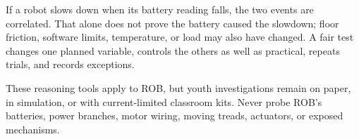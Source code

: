 \begin{advancedbox}[title={CAUSE, CORRELATION, AND A FAIR TEST}]
If a robot slows down when its battery reading falls, the two events are correlated. That alone does not prove the battery caused the slowdown; floor friction, software limits, temperature, or load may also have changed. A fair test changes one planned variable, controls the others as well as practical, repeats trials, and records exceptions.
\end{advancedbox}

\begin{safetybox}
These reasoning tools apply to ROB, but youth investigations remain on paper, in simulation, or with current-limited classroom kits. Never probe ROB's batteries, power branches, motor wiring, moving treads, actuators, or exposed mechanisms.
\end{safetybox}

